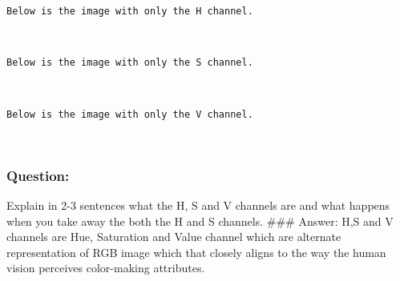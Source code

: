 \documentclass[11pt]{article}
\begin{document}
    \begin{Verbatim}[commandchars=\\\{\}]
Below is the image with only the H channel.

    \end{Verbatim}

    \begin{center}
    \end{center}
    { \hspace*{\fill} \\}
    
    \begin{Verbatim}[commandchars=\\\{\}]
Below is the image with only the S channel.

    \end{Verbatim}

    \begin{center}
    \end{center}
    { \hspace*{\fill} \\}
    
    \begin{Verbatim}[commandchars=\\\{\}]
Below is the image with only the V channel.

    \end{Verbatim}

    \begin{center}
    \end{center}
    { \hspace*{\fill} \\}
    
    \hypertarget{question}{%
\subsubsection{Question:}\label{question}}

Explain in 2-3 sentences what the H, S and V channels are and what
happens when you take away the both the H and S channels. \#\#\# Answer:
H,S and V channels are Hue, Saturation and Value channel which are
alternate representation of RGB image which that closely aligns to the
way the human vision perceives color-making attributes.
\end{document}
